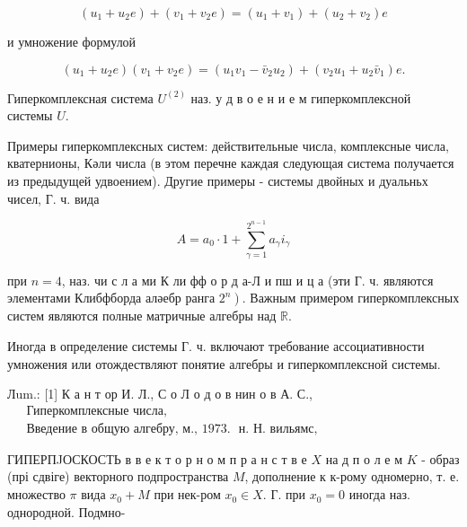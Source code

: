 \documentclass[10pt]{article}
\begin{document}
\[

\left(u_{1}+u_{2} e\right)+\left(v_{1}+v_{2} e\right)=\left(u_{1}+v_{1}\right)+\left(u_{2}+v_{2}\right) e

\]



и умножение формулой



\[

\left(u_{1}+u_{2} e\right)\left(v_{1}+v_{2} e\right)=\left(u_{1} v_{1}-\bar{v}_{2} u_{2}\right)+\left(v_{2} u_{1}+u_{2} \bar{v}_{1}\right) e .

\]



Гиперкомплексная система $U^{(2)}$ наз. у д в о е н и е м гиперкомплексной системы $U$.



Примеры гиперкомплексных систем: действительные числа, комплексные числа, кватернионы, Кәли числа (в этом перечне каждая следующая система получается из предыдущей удвоением). Другие примеры - системы двойных и дуальньх чисел, Г. ч. вида



\[

A=a_{0} \cdot 1+\sum_{\gamma=1}^{2^{n-1}} a_{\gamma} i_{\gamma}

\]



при $n=4$, наз. чи с л а ми К ли фф о р д а-Л и пш и ц а (эти Г. ч. являются элементами Клибфборда аләебр ранга $\left.2^{n}\right)$. Важным примером гиперкомплексных систем являются полные матричные алгебры над $\mathbb{R}$.



Иногда в определение системы Г. ч. включают требование ассоциативности умножения или отождествляют понятие алгебры и гиперкомплексной системы.



Лum.: [1] К а н т ор И. Л., С о Л о д о в нин о в А. С., $\begin{aligned} & \text { Гиперкомплексные числа, } \\ & \text { Введение в общую алгебру, м., 1973. } \text { н. Н. вильямс, }\end{aligned}$



ГИПЕРПJОСКОСТЬ в в е к т о р н о м п р а н с т в е $X$ на д п о л е м $K$ - образ (прі сдвіге) векторного подпространства $M$, дополнение к к-рому одномерно, т. е. множество $\pi$ вида $x_{0}+M$ при нек-ром $x_{0} \in X$. Г. при $x_{0}=0$ иногда наз. однородной. Подмно-
\end{document}

